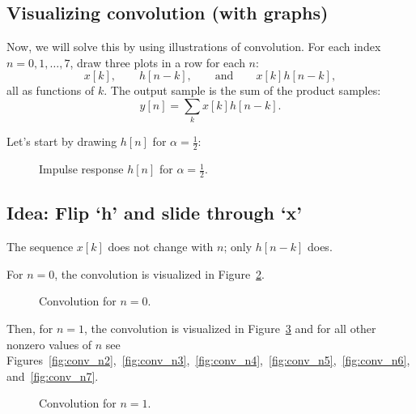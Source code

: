 \subsection{Visualizing convolution (with graphs)}
Now, we will solve this by using illustrations of convolution. For each index $n=0,1,\dots,7$, draw three plots in a row for each $n$:
\[
x[k],\qquad h[n-k],\qquad \text{and}\qquad x[k]h[n-k],
\]
all as functions of $k$. The output sample is the sum of the product samples:
\[
y[n]=\sum_k x[k]h[n-k].
\]

Let's start by drawing $h[n]$ for $\alpha = \tfrac{1}{2}$:

\def\Alpha{0.5}
\def\HLen{5}     %
\def\kmin{-2}    %
\def\kmax{10}

\begin{figure}[h]
    \centering
   
    \label{fig:hn}
    \caption{Impulse response $h[n]$ for $\alpha=\tfrac12$.}
\end{figure}
\subsection{Idea: Flip `h' and slide through `x'}
The sequence $x[k]$ does not change with $n$; only $h[n-k]$ does.

For $n=0$, the convolution is visualized in Figure~\ref{fig:conv_n0}. 
\begin{figure}[h]
    \centering
    \caption{Convolution for $n=0$.}
    \label{fig:conv_n0}
\end{figure}


Then, for $n=1$, the convolution is visualized in Figure~\ref{fig:conv_n1} and for all other nonzero values of $n$ see Figures~\ref{fig:conv_n2},~\ref{fig:conv_n3},~\ref{fig:conv_n4},~\ref{fig:conv_n5},~\ref{fig:conv_n6}, and~\ref{fig:conv_n7}.

\begin{figure}[h]
    \centering
    \caption{Convolution for $n=1$.}
    \label{fig:conv_n1}
\end{figure}

